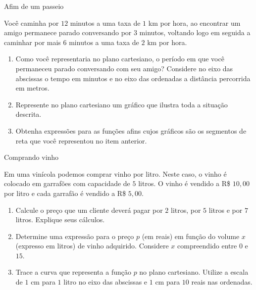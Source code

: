 \label{\detokenize{AF107-A::doc}}\label{\detokenize{AF107-A:para-saber-mais-funcao-afim-por-partes}}
\begin{task}{Afim de um passeio}



Você caminha por \(12\) minutos a uma taxa de \(1\) km por hora,  ao encontrar um amigo permanece parado conversando por \(3\) minutos, voltando logo em seguida  a caminhar por mais \(6\) minutos a uma taxa de \(2\) km por hora.
\begin{enumerate}
\item {} 
Como você representaria no plano cartesiano, o período em que você permaneceu parado conversando com seu amigo? Considere no eixo das abscissas o tempo em minutos e no eixo das ordenadas a distância percorrida em metros.

\item {} 
Represente no plano cartesiano um gráfico que ilustra toda a situação descrita.

\item {} 
Obtenha expressões para as funções afins cujos gráficos são os segmentos de reta que você representou no item anterior.

\end{enumerate}
\end{task}



\begin{task}{Comprando vinho}



Em uma vinícola podemos comprar vinho por litro. Neste caso, o vinho é colocado em garrafões com capacidade de \(5\) litros. O vinho é vendido a R\$ \(10,00\) por litro e cada garrafão é vendido a R\$ \(5,00\).
\begin{enumerate}
\item {} 
Calcule o preço que um cliente deverá pagar por \(2\) litros, por \(5\) litros e por \(7\) litros. Explique seus cálculos.

\item {} 
Determine uma expressão para o preço \(p\) (em reais) em função do volume \(x\) (expresso em litros) de vinho adquirido. Considere \(x\) compreendido entre \(0\) e \(15\).

\item {} 
Trace a curva que representa a função \(p\) no plano cartesiano. Utilize a escala de \(1\) cm para \(1\) litro no eixo das abscissas e \(1\) cm para \(10\) reais nas ordenadas.

\end{enumerate}
\end{task}




